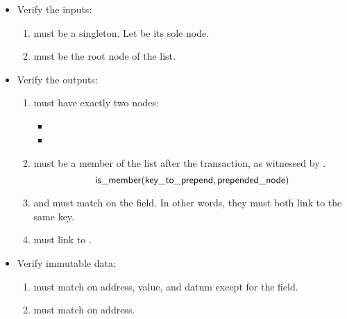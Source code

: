 \documentclass[../midgard.tex]{subfiles}
\begin{document}
\begin{description}
\begin{itemize}
            \item Verify the inputs:
            \begin{enumerate}[resume]
                \item {} must be a singleton.
                  Let  be its sole node.
                \item {} must be the root node of the list.
            \end{enumerate}
            
            \item Verify the outputs:
            \begin{enumerate}[resume]
                \item {} must have exactly two nodes:
                    \begin{itemize}
                        \item {}
                        \item {}  
                    \end{itemize}
                \item {} must be a member of the list after the transaction, as witnessed by .
                    \begin{equation*}
                        \mathsf{is\_member} (\mathsf{key\_to\_prepend}, \mathsf{prepended\_node})
                    \end{equation*}
                \item {} and  must match on the  field.
                  In other words, they must both link to the same key.
                \item {} must link to .
            \end{enumerate}
            
            \item Verify immutable data:
            \begin{enumerate}[resume]
                \item {} must match  on address, value, and datum except for the  field.
                \item {} must match  on address.
            \end{enumerate}
        \end{itemize}
    

\end{description}
\end{document}

